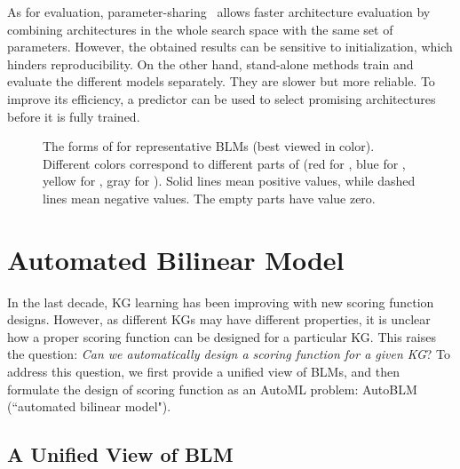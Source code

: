 \documentclass[10pt,journal,compsoc]{IEEEtran}
\begin{document}
As for evaluation,
parameter-sharing~\cite{liu2018darts,pham2018efficient,yao2019differentiable} 
allows faster architecture evaluation by
combining architectures in the whole search space
with the same set of parameters.
However,
the obtained results can
be sensitive to initialization, which hinders reproducibility.
On the other hand,
 stand-alone methods 
\cite{zoph2017neural,liu2018progressive,real2019regularized}
train 
and evaluate 
the different models 
separately.
They are slower but more reliable.
To improve its efficiency,
a predictor can be used to select promising architectures~\cite{liu2018progressive}
before it is fully trained.

\begin{figure*}[ht]
	\centering
	\small 
	\quad
	\quad
	\quad
	\quad
	\vspace{-10px}
\caption{The forms of  for representative
BLMs (best viewed in color).  Different colors correspond to 
different parts of 
	(red for , blue for , yellow for , gray for ).
Solid lines mean positive values, while 
dashed lines mean negative values. 
The empty parts have value zero.
}
\label{fig:graphsf}
\vspace{-10px}
\end{figure*}



\section{Automated Bilinear Model}
\label{sec:search}

In the last decade, KG learning has been improving with new scoring function designs.
However, as different KGs
may have different properties,
it is unclear
how 
a proper scoring function 
can be designed 
for a particular KG.
This raises the question:
\textit{Can we automatically design a scoring function for a given KG}?
To address this question,
we first  provide a unified view of
BLMs, 
and then
formulate the 
design of scoring function 
as an AutoML problem:
AutoBLM
(``automated bilinear model").


\subsection{A Unified View of BLM}
\label{ssec:unified}
\end{document}
